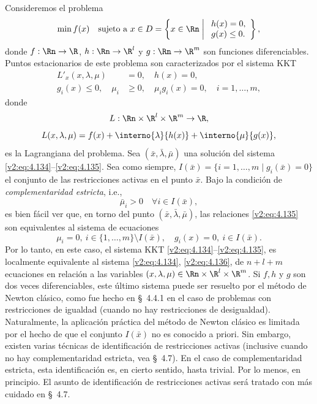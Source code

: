 Consideremos el problema
\begin{equation}
    \min f(x) \quad \text{sujeto a } x \in D = \left\{ x \in \Rn \mathrel{\bigg|} \begin{array}{l} h(x) = 0, \\ g(x) \le 0. \end{array} \right\},
    \label{v2:eq:4.133}
\end{equation}
donde $f : \Rn \to \R$, $h : \Rn \to \R^l$ y $g : \Rn \to \R^m$ son funciones diferenciables.
Puntos estacionarios de este problema son caracterizados por el sistema KKT
\begin{align}
    L'_x(x, \lambda, \mu) &= 0, \quad h(x) = 0, \label{v2:eq:4.134} \\
    g_i(x) \le 0, \quad \mu_i &\ge 0, \quad \mu_i g_i(x) = 0, \quad i = 1, \dots, m, \label{v2:eq:4.135}
\end{align}
donde
\[
    L : \Rn \times \R^l \times \R^m \to \R,
\]
\[
    L(x, \lambda, \mu) = f(x) + \interno{\lambda}{h(x)} + \interno{\mu}{g(x)},
\]
es la Lagrangiana del problema.
Sea $(\bar{x}, \bar{\lambda}, \bar{\mu})$ una solución del sistema \eqref{v2:eq:4.134}--\eqref{v2:eq:4.135}. Sea como siempre, $I(\bar{x}) = \{i = 1, \dots, m \mid g_i(\bar{x}) = 0\}$ el conjunto de las restricciones activas en el punto $\bar{x}$. Bajo la condición de \textit{complementaridad estricta}, i.e.,
\[
    \bar{\mu}_i > 0 \quad \forall i \in I(\bar{x}),
\]
es bien fácil ver que, en torno del punto $(\bar{x}, \bar{\lambda}, \bar{\mu})$, las relaciones \eqref{v2:eq:4.135} son equivalentes al sistema de ecuaciones
\begin{equation}
    \mu_i = 0, \ i \in \{1, \dots, m\} \setminus I(\bar{x}), \quad g_i(x) = 0, \ i \in I(\bar{x}).
    \label{v2:eq:4.136}
\end{equation}
Por lo tanto, en este caso, el sistema KKT \eqref{v2:eq:4.134}--\eqref{v2:eq:4.135}, es localmente equivalente al sistema \eqref{v2:eq:4.134}, \eqref{v2:eq:4.136}, de $n + l + m$ ecuaciones en relación a las variables $(x, \lambda, \mu) \in \Rn \times \R^l \times \R^m$. Si $f, h$ y $g$ son dos veces diferenciables, este último sistema puede ser resuelto por el método de Newton clásico, como fue hecho en \S~4.4.1 en el caso de problemas con restricciones de igualdad (cuando no hay restricciones de desigualdad). Naturalmente, la aplicación práctica del método de Newton clásico es limitada por el hecho de que el conjunto $I(\bar{x})$ no es conocido a priori. Sin embargo, existen varias técnicas de identificación de restricciones activas (inclusive cuando no hay complementaridad estricta, vea \S~4.7). En el caso de complementaridad estricta, esta identificación es, en cierto sentido, hasta trivial. Por lo menos, en principio. El asunto de identificación de restricciones activas será tratado con más cuidado en \S~4.7.

